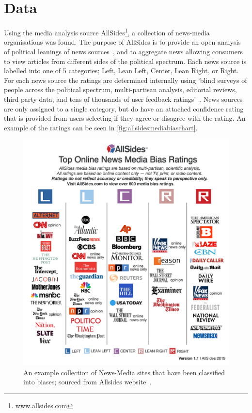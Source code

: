 \section{Data}

Using the media analysis source AllSides\footnote{www.allsides.com}, a collection of news-media organisations was found. The purpose of AllSides is to provide an open  analysis of political leanings of news sources~\cite{gable_media_2019}, and to aggregate news allowing consumers to view articles from different sides of the political spectrum. Each news source is labelled into one of 5 categories; {\color{Left}Left},
{\color{LeanLeft}Lean Left},
{\color{Center}Center},
{\color{LeanRight}Lean Right}, or
{\color{Right}Right}.
For each news source the ratings are determined internally using `blind surveys of people across the political spectrum, multi-partisan analysis, editorial reviews, third party data, and tens of thousands of user feedback ratings'~\cite{gable_media_2019}. News sources are only assigned to a single category, but do have an attached confidence rating that is provided from users selecting if they agree or disagree with the rating. An example of the ratings can be seen in \autoref{fig:allsidesmediabiaschart}.

\begin{figure}[!htbp]
	\centering
	\includegraphics[width=\linewidth]{chapter1/figs/AllSidesMediaBiasChart}
	\caption{An example collection of News-Media sites that have been classified into biases; sourced from Allsides website~\cite{gable_media_2019}.}
	\label{fig:allsidesmediabiaschart}
\end{figure}



